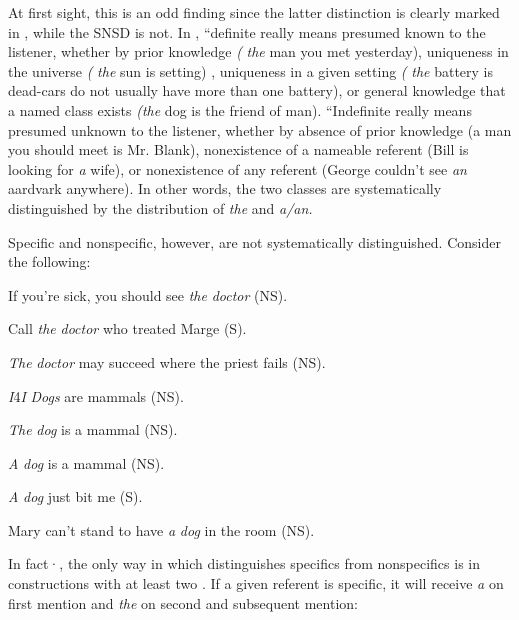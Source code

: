At first sight, this is an odd finding since the latter distinction is clearly marked in , while the SNSD is not. In , ``definite really means presumed known to the listener, whether by prior knowledge \textit{(} \textit{{\textquotedbl}the} man you met yesterday{\textquotedbl}), uniqueness in the universe \textit{(} \textit{{\textquotedbl}the} sun is setting{\textquotedbl}) , uniqueness in a given setting \textit{(} \textit{{\textquotedbl}the} battery is dead{\textquotedbl}-cars do not usually have more than one battery), or general knowledge that a named class exists \textit{({\textquotedbl}the} dog is the friend of man{\textquotedbl}). ``Indefinite really means presumed unknown to the listener, whether by absence of prior knowledge ({\textquotedbl}a man you should meet is Mr. Blank{\textquotedbl}), nonexistence of a nameable referent ({\textquotedbl}Bill is looking for \textit{a} wife{\textquotedbl}), or nonexistence of any referent ({\textquotedbl}George couldn't see \textit{an} aardvark anywhere{\textquotedbl}). In other words, the two classes are systematically distinguished by the distribution of \textit{the} and \textit{a/an.}

Specific and nonspecific, however, are not systematically dis\-tinguished. Consider the following:

\ea\label{ex:1}
 If you're sick, you should see \textit{the} \textit{doctor} (NS).
\glt
\z

\ea\label{ex:2}
 Call \textit{the} \textit{doctor} who treated Marge (S).
\glt
\z

\ea\label{ex:3}
 \textit{The} \textit{doctor} may succeed where the priest fails (NS).
\glt
\z

\textit{I}4\textit{I }\textit{Dogs} are mammals (NS).

\ea\label{ex:5}
 \textit{The} \textit{dog} is a mammal (NS).
\glt
\z

\ea\label{ex:6}
 \textit{A} \textit{dog} is a mammal (NS).
\glt
\z


\ea\label{ex:7}
\textit{A} \textit{dog} just bit me (S).
\glt
\z

\ea\label{ex:8}
 Mary can't stand to have \textit{a} \textit{dog} in the room (NS).
\glt
\z

In fact·, the only way in which  distinguishes specifics from nonspecifics is in constructions with at least two . If a given referent is specific, it will receive \textit{a} on first mention and \textit{the} on second and subsequent mention:

